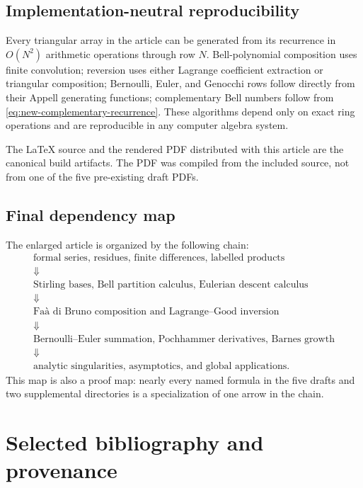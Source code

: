 \documentclass[11pt,a4paper,oneside,openany]{book}
\theoremstyle{definition}
\theoremstyle{remark}
\begin{document}
\section{Implementation-neutral reproducibility}

Every triangular array in the article can be generated from its recurrence in
$O(N^2)$ arithmetic operations through row $N$.  Bell-polynomial composition
uses finite convolution; reversion uses either Lagrange coefficient extraction
or triangular composition; Bernoulli, Euler, and Genocchi rows follow directly
from their Appell generating functions; complementary Bell numbers follow from
\eqref{eq:new-complementary-recurrence}.  These algorithms depend only on exact
ring operations and are reproducible in any computer algebra system.

The LaTeX source and the rendered PDF distributed with this article are the
canonical build artifacts.  The PDF was compiled from the included source, not
from one of the five pre-existing draft PDFs.

\section{Final dependency map}

The enlarged article is organized by the following chain:
\[
\begin{gathered}
 \text{formal series, residues, finite differences, labelled products}\\
 \Downarrow\\
 \text{Stirling bases, Bell partition calculus, Eulerian descent calculus}\\
 \Downarrow\\
 \text{Faà di Bruno composition and Lagrange--Good inversion}\\
 \Downarrow\\
 \text{Bernoulli--Euler summation, Pochhammer derivatives, Barnes growth}\\
 \Downarrow\\
 \text{analytic singularities, asymptotics, and global applications}.
\end{gathered}
\]
This map is also a proof map: nearly every named formula in the five drafts and
two supplemental directories is a specialization of one arrow in the chain.

\backmatter

\chapter*{Selected bibliography and provenance}
\end{document}
